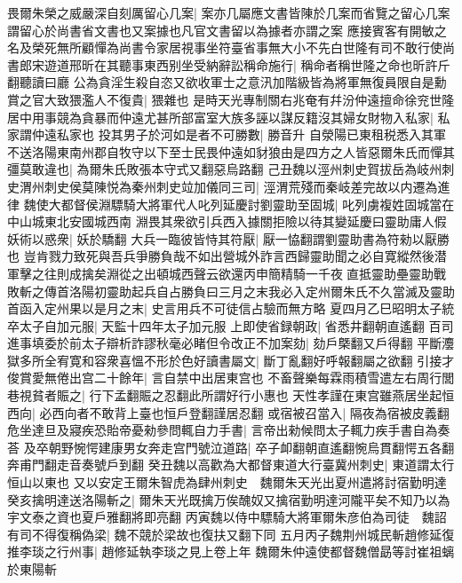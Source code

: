 畏爾朱榮之威嚴深自刻厲留心几案|{
	案亦几屬應文書皆陳於几案而省覽之留心几案謂留心於尚書省文書也又案據也凡官文書留以為據者亦謂之案}
應接賓客有開敏之名及榮死無所顧憚為尚書令家居視事坐符臺省事無大小不先白世隆有司不敢行使尚書郎宋遊道邢昕在其聽事東西别坐受納辭訟稱命施行|{
	稱命者稱世隆之命也昕許斤翻聽讀曰廳}
公為貪淫生殺自恣又欲收軍士之意汛加階級皆為將軍無復員限自是勳賞之官大致猥濫人不復貴|{
	猥雜也}
是時天光專制關右兆奄有幷汾仲遠擅命徐兖世隆居中用事競為貪暴而仲遠尤甚所部富室大族多誣以謀反籍沒其婦女財物入私家|{
	私家謂仲遠私家也}
投其男子於河如是者不可勝數|{
	勝音升}
自滎陽已東租税悉入其軍不送洛陽東南州郡自牧守以下至士民畏仲遠如豺狼由是四方之人皆惡爾朱氏而憚其彊莫敢違也|{
	為爾朱氏敗張本守式又翻惡烏路翻}
己丑魏以涇州刺史賀拔岳為岐州刺史渭州刺史侯莫陳悦為秦州刺史竝加儀同三司|{
	涇渭荒殘而秦岐差完故以内遷為進律}
魏使大都督侯淵驃騎大將軍代人叱列延慶討劉靈助至固城|{
	叱列虜複姓固城當在中山城東北安國城西南}
淵畏其衆欲引兵西入據關拒險以待其變延慶曰靈助庸人假妖術以惑衆|{
	妖於驕翻}
大兵一臨彼皆恃其符厭|{
	厭一恊翻謂劉靈助書為符勑以厭勝也}
豈肯戮力致死與吾兵爭勝負哉不如出營城外詐言西歸靈助聞之必自寛縱然後潜軍擊之往則成擒矣淵從之出頓城西聲云欲還丙申簡精騎一千夜直抵靈助壘靈助戰敗斬之傳首洛陽初靈助起兵自占勝負曰三月之末我必入定州爾朱氏不久當滅及靈助首函入定州果以是月之末|{
	史言用兵不可徒信占驗而無方略}
夏四月乙巳昭明太子統卒太子自加元服|{
	天監十四年太子加元服}
上即使省録朝政|{
	省悉井翻朝直遙翻}
百司進事填委於前太子辯析詐謬秋毫必睹但令改正不加案劾|{
	劾戶槩翻又戶得翻}
平斷灋獄多所全宥寛和容衆喜慍不形於色好讀書屬文|{
	斷丁亂翻好呼報翻屬之欲翻}
引接才俊賞愛無倦出宫二十餘年|{
	言自禁中出居東宫也}
不畜聲樂每霖雨積雪遣左右周行閭巷視貧者賑之|{
	行下孟翻賑之忍翻此所謂好行小惠也}
天性孝謹在東宫雖燕居坐起恒西向|{
	必西向者不敢背上臺也恒戶登翻謹居忍翻}
或宿被召當入|{
	隔夜為宿被皮義翻}
危坐達旦及寢疾恐貽帝憂勑參問輒自力手書|{
	言帝出勑候問太子輒力疾手書自為奏荅}
及卒朝野惋愕建康男女奔走宫門號泣道路|{
	卒子卹翻朝直遙翻惋烏貫翻愕五各翻奔甫門翻走音奏號戶到翻}
癸丑魏以高歡為大都督東道大行臺冀州刺史|{
	東道謂太行恒山以東也}
又以安定王爾朱智虎為肆州刺史　魏爾朱天光出夏州遣將討宿勤明達癸亥擒明達送洛陽斬之|{
	爾朱天光既擒万俟醜奴又擒宿勤明達河隴平矣不知乃以為宇文泰之資也夏戶雅翻將即亮翻}
丙寅魏以侍中驃騎大將軍爾朱彦伯為司徒　魏詔有司不得復稱偽梁|{
	魏不競於梁故也復扶又翻下同}
五月丙子魏荆州城民斬趙修延復推李琰之行州事|{
	趙修延執李琰之見上卷上年}
魏爾朱仲遠使都督魏僧勗等討崔祖螭於東陽斬

